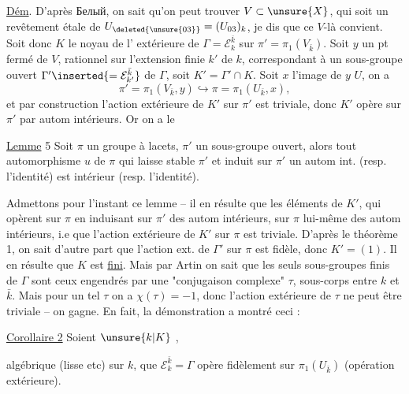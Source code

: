 \uline{Dém}. D'après Белый, on sait qu'on peut trouver $V\subset\unsure{X}$, qui soit un revêtement étale de $U_{\deleted{\unsure{03}}}=(U_{03})_k$, je dis que ce $V$-là convient. Soit donc $K$ le noyau de l' extérieure de $\Gamma=\mathcal E_k^{\bar k}$ sur $\pi'=\pi_1(V_{\bar k})$. Soit $y$ un pt fermé de $V$, rationnel sur l'extension finie $k'$ de $k$, correspondant à un sous-groupe ouvert $\Gamma'\inserted{=\mathcal E_{k'}^{\bar k}}$ de $\Gamma$, soit $K'=\Gamma'\cap K$. Soit $x$ l'image de $y$  $U$, on a
\[
\pi'=\pi_1(V_{\bar k},y)\hookrightarrow\pi=\pi_1(U_{\bar k},x),
\]
et par construction l'action extérieure de $K'$ sur $\pi'$ est triviale, donc $K'$ opère sur $\pi'$ par autom intérieurs. Or on a le

\uline{Lemme} 5 Soit $\pi$ un groupe  à lacets, $\pi'$ un sous-groupe ouvert, alors tout automorphisme $u$ de $\pi$ qui laisse stable $\pi'$ et induit sur $\pi'$ un autom int. (resp. l'identité) est intérieur (resp. l'identité).


Admettons pour l'instant ce lemme -- il en résulte que les éléments de $K'$, qui opèrent sur $\pi$ en induisant sur $\pi'$ des autom intérieurs,  sur $\pi$ lui-même des autom intérieurs, i.e que l'action extérieure de $K'$ sur $\pi$ est triviale. D'après le théorème 1, on sait d'autre part que l'action ext. de $\Gamma'$ sur $\pi$ est fidèle, donc $K'=(1)$. Il en résulte que $K$ est \uline{fini}. Mais par Artin on sait que les seuls sous-groupes finis  de $\Gamma$ sont ceux engendrés par une "conjugaison  complexe" $\tau$,   sous-corps   entre $k$ et $\bar k$. Mais pour un tel $\tau$ on a $\chi(\tau)=-1$, donc l'action extérieure de $\tau$ ne peut être triviale -- on gagne. En fait, la démonstration a montré ceci :

\uline{Corollaire 2} Soient $\unsure{k|K}$  ,


 algébrique (lisse etc) sur $k$,  que $\mathcal E_k^{\bar k}=\Gamma$ opère fidèlement sur $\pi_1(U_{\bar k})$ (opération extérieure).

